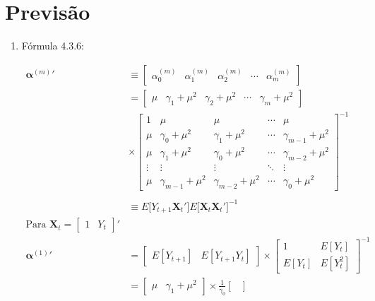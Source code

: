 \chapter{Previsão}

\begin{enumerate}
	\item[\fbox{4.1}]
	
	Fórmula 4.3.6: 
	
	\begin{align*}
		\boldsymbol{\alpha}^{(m)}{'}&\equiv
		\begin{bmatrix}
\alpha_0^{(m)}&\alpha_1^{(m)}&\alpha_2^{(m)}&\cdots&\alpha_m^{(m)}
		\end{bmatrix}\\
		&=\begin{bmatrix}
		\mu&\gamma_1+\mu^2&\gamma_2+\mu^2&\cdots&\gamma_m+\mu^2
		\end{bmatrix}\\
		&\times\begin{bmatrix}
		1&\mu&\mu&\cdots&\mu\\[0.3cm]
		\mu&\gamma_0+\mu^2&\gamma_1+\mu^2&\cdots&\gamma_{m-1}+\mu^2\\[0.3cm]
		\mu&\gamma_1+\mu^2&\gamma_0+\mu^2&\cdots&\gamma_{m-2}+\mu^2\\[0.3cm]
		\vdots&\vdots&\vdots&\ddots&\vdots\\[0.3cm]
		\mu&\gamma_{m-1}+\mu^2&\gamma_{m-2}+\mu^2&\cdots&\gamma_0+\mu^2
		\end{bmatrix}^{-1}\\
		\\
		&\equiv  {E}\big[Y_{t+1}\mathbf{X}_t'\big] {E}\big[\mathbf{X}_t\mathbf{X}_t'\big]^{-1}\\
		\text{Para }\mathbf{X}_t=\begin{bmatrix}
		1&Y_t
		\end{bmatrix}'\\
		\boldsymbol{\alpha}^{(1)}{'}&=\begin{bmatrix}
		 {E}[Y_{t+1}]&
		 {E}[Y_{t+1}Y_t]
		\end{bmatrix}
		\times
		\begin{bmatrix}
		1&E[Y_{t}]\\[0.3cm]
		E[Y_{t}]&E[Y_{t}^2]
		\end{bmatrix}^{-1}\\
		&=\begin{bmatrix}
		\mu&
		\gamma_1+\mu^2
		\end{bmatrix}
		\times
		\frac{1}{\gamma_0}
		\begin{bmatrix}

\end{bmatrix}
\end{align*}
\end{enumerate}
